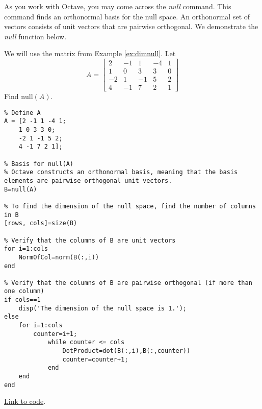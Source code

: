 \documentclass{ximera}
\begin{document}
As you work with Octave, you may come across the \emph{null} command.  This command finds an orthonormal basis for the null space.  An orthonormal set of vectors consists of unit vectors that are pairwise orthogonal.  We demonstrate the \emph{null} function below.

\begin{template}\label{temp:nullSpace}
    We will use the matrix from Example \ref{ex:dimnull}.  Let 
$$A=\begin{bmatrix}2&-1&1&-4&1\\1&0&3&3&0\\-2&1&-1&5&2\\4&-1&7&2&1\end{bmatrix}$$
Find $\mbox{null}(A)$.

\begin{verbatim}
% Define A
A = [2 -1 1 -4 1;
    1 0 3 3 0;
    -2 1 -1 5 2;
    4 -1 7 2 1];

% Basis for null(A)
% Octave constructs an orthonormal basis, meaning that the basis elements are pairwise orthogonal unit vectors.
B=null(A)

% To find the dimension of the null space, find the number of columns in B
[rows, cols]=size(B)

% Verify that the columns of B are unit vectors
for i=1:cols
    NormOfCol=norm(B(:,i))
end    

% Verify that the columns of B are pairwise orthogonal (if more than one column)
if cols==1
    disp('The dimension of the null space is 1.');
else    
    for i=1:cols
        counter=i+1;
            while counter <= cols
                DotProduct=dot(B(:,i),B(:,counter))
                counter=counter+1;
            end
    end
end  

\end{verbatim}

\href{https://sagecell.sagemath.org/?z=eJyNUstO5DAQvEfKP9QFkdHOIDLLaiXAhwmcFw5oL4hDSDpMS4l7ZDuM2K-nnQdvoe1Idlx2dXWXfYBLatgSNmmygcHtGqscOVYnyM_SBBo5jvFTv-NpvVrH_Ry_sJ6Qk7j8DcXvFEmTAxSlZ49GHGzfttlmEcGrKpSPhEqsD66vgkdpIS5sxYrryhb3kbVER6Vl-4CwLYMONOKgljqykeUIu5Ldnj2N_AexSu8tBzxSFcT5ozQpzIt2VL8RaKP1kLBmzeRZVL4ZgHgSfldWtHw9Zfvunlw8Uknbd9aDLYo0uXWy1zIV9HfG8z_KiknjLzlunl4Ln3maohjKfltimkR_2OSnMdPo5B814qq5kNZES7IiO13yQpOTlqTxnypfmZNxg050U2natp1pmpyHBr0x-VhEzX6XHd587xP0RvKjw4VeOLUqNVQXx89Nxaikt4Gc4R_zs5pjv-WW5n2cG7wnznEp4dpJrc_G1BImZ5ZxmqjRpo-kWXWaP2mrrSMw_OjwDIwb4og=&lang=octave&interacts=eJyLjgUAARUAuQ==}{Link to code}.
\end{template}
\end{document}
